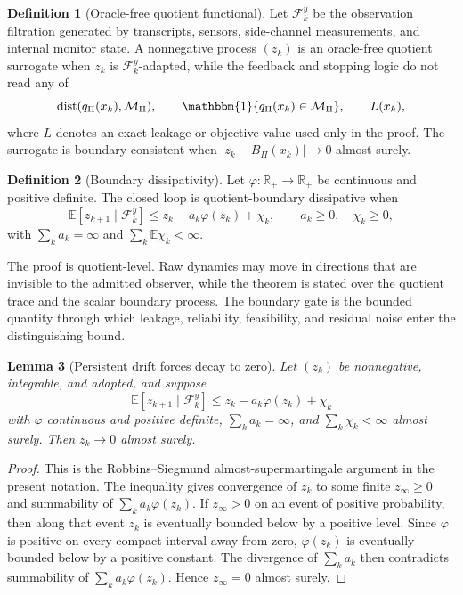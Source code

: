 \documentclass[11pt]{article}
\theoremstyle{definition}
\newtheorem{definition}{Definition}[section]
\theoremstyle{plain}
\newtheorem{lemma}[definition]{Lemma}
\theoremstyle{remark}
\newcommand{\E}{\mathbb{E}}
\newcommand{\R}{\mathbb{R}}
\newcommand{\cF}{\mathcal{F}}
\newcommand{\cM}{\mathcal{M}}
\newcommand{\ind}{\mathbbm{1}}
\begin{document}
\begin{definition}[Oracle-free quotient functional]
Let $\cF_k^y$ be the observation filtration generated by transcripts, sensors, side-channel measurements, and internal monitor state. A nonnegative process $(z_k)$ is an oracle-free quotient surrogate when $z_k$ is $\cF_k^y$-adapted, while the feedback and stopping logic do not read any of
\[
    \operatorname{dist}(q_\Pi(x_k),\cM_\Pi),\qquad \ind\{q_\Pi(x_k)\in\cM_\Pi\},\qquad L(x_k),
\]
where $L$ denotes an exact leakage or objective value used only in the proof. The surrogate is boundary-consistent when $|z_k-B_\Pi(x_k)|\to0$ almost surely.
\end{definition}

\begin{definition}[Boundary dissipativity]
Let $\varphi:\R_+\to\R_+$ be continuous and positive definite. The closed loop is quotient-boundary dissipative when
\[
    \E[z_{k+1}\mid \cF_k^y]\le z_k-a_k\varphi(z_k)+\chi_k,
    \qquad a_k\ge0,\quad \chi_k\ge0,
\]
with $\sum_k a_k=\infty$ and $\sum_k\E\chi_k<\infty$.
\end{definition}

The proof is quotient-level. Raw dynamics may move in directions that are invisible to the admitted observer, while the theorem is stated over the quotient trace and the scalar boundary process. The boundary gate is the bounded quantity through which leakage, reliability, feasibility, and residual noise enter the distinguishing bound.

\begin{lemma}[Persistent drift forces decay to zero]
Let $(z_k)$ be nonnegative, integrable, and adapted, and suppose
\[
    \E[z_{k+1}\mid\cF_k^y]\le z_k-a_k\varphi(z_k)+\chi_k
\]
with $\varphi$ continuous and positive definite, $\sum_k a_k=\infty$, and $\sum_k\chi_k<\infty$ almost surely. Then $z_k\to0$ almost surely.
\end{lemma}

\begin{proof}
This is the Robbins--Siegmund almost-supermartingale argument in the present notation. The inequality gives convergence of $z_k$ to some finite $z_\infty\ge0$ and summability of $\sum_k a_k\varphi(z_k)$. If $z_\infty>0$ on an event of positive probability, then along that event $z_k$ is eventually bounded below by a positive level. Since $\varphi$ is positive on every compact interval away from zero, $\varphi(z_k)$ is eventually bounded below by a positive constant. The divergence of $\sum_k a_k$ then contradicts summability of $\sum_k a_k\varphi(z_k)$. Hence $z_\infty=0$ almost surely.
\end{proof}
\end{document}
